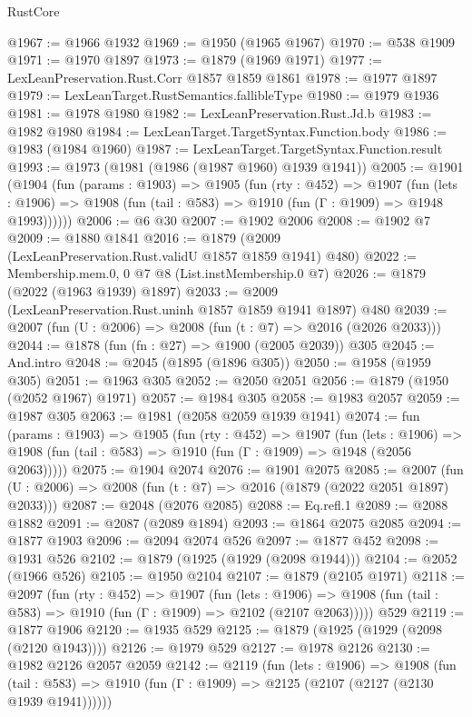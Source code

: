 \begin{lexlean}{RustCore}
\begin{coremodule}
@1967 := @1966 @1932
@1969 := @1950 (@1965 @1967)
@1970 := @538 @1909
@1971 := @1970 @1897
@1973 := @1879 (@1969 @1971)
@1977 := LexLeanPreservation.Rust.Corr @1857 @1859 @1861
@1978 := @1977 @1897
@1979 := LexLeanTarget.RustSemantics.fallibleType
@1980 := @1979 @1936
@1981 := @1978 @1980
@1982 := LexLeanPreservation.Rust.Jd.b
@1983 := @1982 @1980
@1984 := LexLeanTarget.TargetSyntax.Function.body
@1986 := @1983 (@1984 @1960)
@1987 := LexLeanTarget.TargetSyntax.Function.result
@1993 := @1973 (@1981 (@1986 (@1987 @1960) @1939 @1941))
@2005 := @1901
    (@1904
      (fun (params : @1903) =>
      @1905
        (fun (rty : @452) =>
        @1907
          (fun (lets : @1906) =>
          @1908 (fun (tail : @583) => @1910 (fun (Γ : @1909) => @1948 @1993))))))
@2006 := @6 @30
@2007 := @1902 @2006
@2008 := @1902 @7
@2009 := @1880 @1841
@2016 := @1879 (@2009 (LexLeanPreservation.Rust.validU @1857 @1859 @1941) @480)
@2022 := Membership.mem.{0, 0} @7 @8 (List.instMembership.{0} @7)
@2026 := @1879 (@2022 (@1963 @1939) @1897)
@2033 := @2009 (LexLeanPreservation.Rust.uninh @1857 @1859 @1941 @1897) @480
@2039 := @2007 (fun (U : @2006) => @2008 (fun (t : @7) => @2016 (@2026 @2033)))
@2044 := @1878 (fun (fn : @27) => @1900 (@2005 @2039)) @305
@2045 := And.intro
@2048 := @2045 (@1895 (@1896 @305))
@2050 := @1958 (@1959 @305)
@2051 := @1963 @305
@2052 := @2050 @2051
@2056 := @1879 (@1950 (@2052 @1967) @1971)
@2057 := @1984 @305
@2058 := @1983 @2057
@2059 := @1987 @305
@2063 := @1981 (@2058 @2059 @1939 @1941)
@2074 := fun (params : @1903) =>
  @1905
    (fun (rty : @452) =>
    @1907
      (fun (lets : @1906) =>
      @1908 (fun (tail : @583) => @1910 (fun (Γ : @1909) => @1948 (@2056 @2063)))))
@2075 := @1904 @2074
@2076 := @1901 @2075
@2085 := @2007 (fun (U : @2006) => @2008 (fun (t : @7) => @2016 (@1879 (@2022 @2051 @1897) @2033)))
@2087 := @2048 (@2076 @2085)
@2088 := Eq.refl.{1}
@2089 := @2088 @1882
@2091 := @2087 (@2089 @1894)
@2093 := @1864 @2075 @2085
@2094 := @1877 @1903
@2096 := @2094 @2074 @526
@2097 := @1877 @452
@2098 := @1931 @526
@2102 := @1879 (@1925 (@1929 (@2098 @1944)))
@2104 := @2052 (@1966 @526)
@2105 := @1950 @2104
@2107 := @1879 (@2105 @1971)
@2118 := @2097
    (fun (rty : @452) =>
    @1907
      (fun (lets : @1906) =>
      @1908 (fun (tail : @583) => @1910 (fun (Γ : @1909) => @2102 (@2107 @2063)))))
    @529
@2119 := @1877 @1906
@2120 := @1935 @529
@2125 := @1879 (@1925 (@1929 (@2098 (@2120 @1943))))
@2126 := @1979 @529
@2127 := @1978 @2126
@2130 := @1982 @2126 @2057 @2059
@2142 := @2119
    (fun (lets : @1906) =>
    @1908
      (fun (tail : @583) => @1910 (fun (Γ : @1909) => @2125 (@2107 (@2127 (@2130 @1939 @1941))))))

\end{coremodule}
\end{lexlean}
